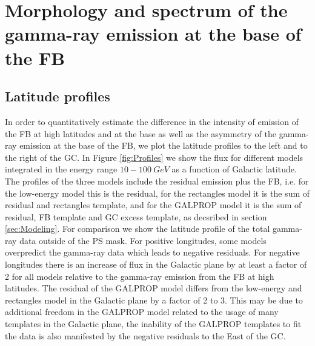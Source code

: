 \section{Morphology and spectrum of the gamma-ray emission at the base of the FB}


\subsection{Latitude profiles}
\label{sec:Latitude_profiles}

In order to quantitatively estimate the difference in the intensity of emission of the FB at high latitudes and at the base as well as the asymmetry
of the gamma-ray emission at the base of the FB,
we plot the latitude profiles to the left and to the right of the GC.
In Figure \ref{fig:Profiles} we show the flux for different models integrated in the energy range $10 - \SI{100}{GeV}$ as a function of Galactic latitude. 
The profiles of the three models include the residual emission plus the FB, i.e. for the low-energy model this is the residual, for the rectangles model it is the sum of residual and rectangles template, and for the GALPROP model it is the sum of residual, FB template and GC excess template, as decsribed in section \ref{sec:Modeling}. For comparison we show the latitude profile of the total gamma-ray data outside of the PS mask.
For positive longitudes,
some models overpredict the gamma-ray data which leads to negative residuals.
For negative longitudes there is an increase of flux in the Galactic plane by at least a factor of 2 for all models relative to the gamma-ray emission
from the FB at high latitudes. 
The residual of the GALPROP model differs from the low-energy and rectangles model in the Galactic plane by a factor of 2 to 3. 
This may be due to additional freedom in the GALPROP model related to the usage of many templates in the Galactic plane,
the inability of the GALPROP templates to fit the data is also manifested by the negative residuals to the East of the GC.


